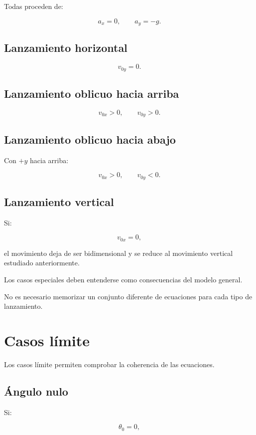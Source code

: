 Todas proceden de:

\[
a_x=0,
\qquad
a_y=-g.
\]


\subsection{Lanzamiento horizontal}

\[
v_{0y}=0.
\]


\subsection{Lanzamiento oblicuo hacia arriba}

\[
v_{0x}>0,
\qquad
v_{0y}>0.
\]


\subsection{Lanzamiento oblicuo hacia abajo}

Con \(+y\) hacia arriba:

\[
v_{0x}>0,
\qquad
v_{0y}<0.
\]


\subsection{Lanzamiento vertical}

Si:

\[
v_{0x}=0,
\]

el movimiento deja de ser bidimensional y se reduce al movimiento vertical
estudiado anteriormente.

\begin{interpretacion}
Los casos especiales deben entenderse como consecuencias del modelo general.

No es necesario memorizar un conjunto diferente de ecuaciones para cada tipo de
lanzamiento.
\end{interpretacion}


\section{Casos límite}

Los casos límite permiten comprobar la coherencia de las ecuaciones.


\subsection{Ángulo nulo}

Si:

\[
\theta_0=0,
\]


